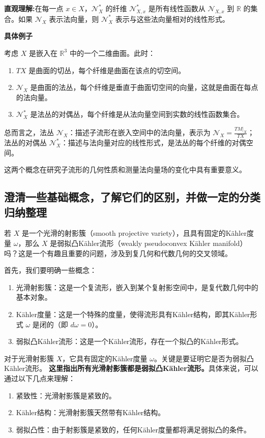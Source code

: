 \documentclass[lang=cn,12pt,fontset=none,a4paper]{beautybook}
\begin{document}
\textbf{直观理解:}在每一点 \( x \in X \)，\( \mathcal{N}_X^* \) 的纤维 \( \mathcal{N}_{X,x}^* \) 是所有线性函数从 \( \mathcal{N}_{X,x} \) 到 \( \mathbb{R} \) 的集合。如果 \( \mathcal{N}_X \) 表示法向量，则 \( \mathcal{N}_X^* \) 表示与这些法向量相对的线性形式。

\textbf{具体例子}

考虑 \( X \) 是嵌入在 \( \mathbb{R}^3 \) 中的一个二维曲面。此时：
\begin{enumerate}
   \item \( TX \) 是曲面的切丛，每个纤维是曲面在该点的切空间。
   \item \( \mathcal{N}_X \) 是曲面的法丛，每个纤维是垂直于曲面切空间的向量，这就是曲面在每点的法向量。
   \item \( \mathcal{N}_X^* \) 是法丛的对偶丛，每个纤维是从法向量空间到实数的线性函数集合。
\end{enumerate}

总而言之，法丛 \( \mathcal{N}_X \)：描述子流形在嵌入空间中的法向量，表示为 \( \mathcal{N}_X = \frac{TM|_X}{TX} \)；
法丛的对偶丛 \( \mathcal{N}_X^* \)：描述与法向量对应的线性形式，是法丛的每个纤维的对偶空间。

这两个概念在研究子流形的几何性质和测量法向量场的变化中具有重要意义。


\subsection{澄清一些基础概念，了解它们的区别，并做一定的分类归纳整理}

若 \( X \) 是一个光滑的射影簇（smooth projective variety），且具有固定的Kähler度量 \(\omega\)，那么 \( X \) 是弱拟凸Kähler流形（weakly pseudoconvex Kähler manifold）吗？这是一个有趣且重要的问题，涉及到复几何和代数几何的交叉领域。

首先，我们要明确一些概念：
\begin{enumerate}
   \item 光滑射影簇：这是一个复流形，嵌入到某个复射影空间中，是复代数几何中的基本对象。
   \item Kähler度量：这是一个特殊的度量，使得流形具有Kähler结构，即其Kähler形式 \( \omega \) 是闭的（即 \( d\omega = 0 \)）。
   \item 弱拟凸Kähler流形：这是一个Kähler流形，存在一个拟凸的Kähler形式。
\end{enumerate}

对于光滑射影簇 \( X \)，它具有固定的Kähler度量 \(\omega\)。关键是要证明它是否为弱拟凸Kähler流形。
\textbf{这里指出所有光滑射影簇都是弱拟凸Kähler流形。}具体来说，可以通过以下几点来理解：
\begin{enumerate}
   \item 紧致性：光滑射影簇是紧致的。
   \item Kähler结构：光滑射影簇天然带有Kähler结构。
   \item 弱拟凸性：由于射影簇是紧致的，任何Kähler度量都将满足弱拟凸的条件。
\end{enumerate}
\end{document}
